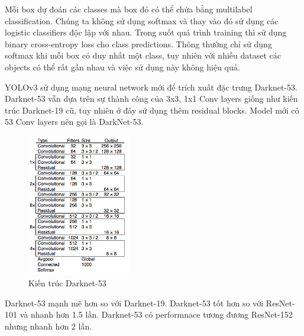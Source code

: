 Mỗi box dự đoán các classes mà box đó có thể chứa bằng multilabel classification. Chúng ta không sử dụng softmax và thay vào đó sử dụng các logistic classifiers độc lập với nhau. Trong suốt quá trình training thì sử dụng binary cross-entropy loss cho class predictions. Thông thường chỉ sử dụng softmax khi mỗi box có duy nhất một class, tuy nhiên với nhiều dataset các objects có thể rất gần nhau và việc sử dụng này không hiệu quả.

YOLOv3 sử dụng mạng neural network mới để trích xuất đặc trưng Darknet-53. Darknet-53 vẫn dựa trên sự thành công của 3x3, 1x1 Conv layers giống như kiến trúc Darknet-19 cũ, tuy nhiên ở đây sử dụng thêm residual blocks. Model mới có 53 Conv layers nên gọi là DarkNet-53.
\begin{figure}[htp]
    \centering
    \includegraphics[width=0.4\textwidth]{images/2a-sign/yolov3_archi.png}
    \caption{Kiến trúc Darknet-53}
\end{figure}

\noindent Darknet-53 mạnh mẽ hơn so với Darknet-19. Darknet-53 tốt hơn so với ResNet-101 và nhanh hơn 1.5 lần. Darknet-53 có performnace tương đương ResNet-152 nhưng nhanh hơn 2 lần.\\

